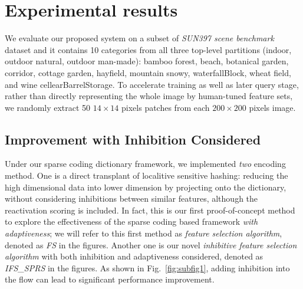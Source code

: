 \documentclass[letterpaper]{article}
\begin{document}
\section{Experimental results}
We evaluate our proposed system on a subset of \emph{SUN397 scene benchmark} dataset and it contains 10 categories from all three top-level partitions (indoor, outdoor natural, outdoor man-made): bamboo forest, beach, botanical garden, corridor, cottage garden, hayfield, mountain snowy, waterfallBlock, wheat field, and wine cellearBarrelStorage.  To accelerate training as well as later query stage, rather than directly representing the whole image by human-tuned feature sets, we randomly extract 50 $14\times14$ pixels patches from each $200\times200$ pixels image.


\subsection{Improvement with Inhibition Considered}
Under our sparse coding dictionary framework, we implemented \emph{two} encoding method. One is a direct transplant of localitive sensitive hashing: reducing the high dimensional data into lower dimension by projecting onto the dictionary, without considering inhibitions between similar features, although the reactivation scoring is included. In fact, this is our first proof-of-concept method to explore the effectiveness of the sparse coding based framework \emph{with adaptiveness}; we will refer to this first method as \emph{feature selection algorithm}, denoted as \emph{FS} in the figures. Another one is our novel \emph{inhibitive feature selection algorithm} with both inhibition and adaptiveness considered, denoted as \emph{IFS\_SPRS} in the figures. As shown in Fig.~\ref{fig:subfig1}, adding inhibition into the flow can lead to significant performance improvement.
\end{document}
